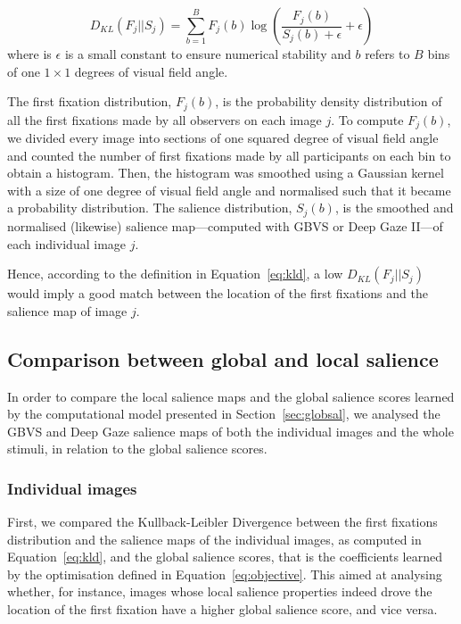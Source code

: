 {\begin{equation}
 D_{KL}(F_{j}||S_{j}) = \sum_{b=1}^{B} F_{j}(b) \log(\frac{F_{j}(b)}{S_{j}(b)+\epsilon}+\epsilon)
 \label{eq:kld}
\end{equation}
%
where is $\epsilon$ is a small constant to ensure numerical stability and $b$ refers to $B$ bins of one $1 \times 1$ degrees of visual field angle.

The first fixation distribution, $F_{j}(b)$, is the probability density distribution of all the first fixations made by all observers on each image $j$. To compute $F_{j}(b)$, we divided every image into sections of one squared degree of visual field angle and counted the number of first fixations made by all participants on each bin to obtain a histogram. Then, the histogram was smoothed using a Gaussian kernel with a size of one degree of visual field angle and normalised such that it became a probability distribution. The salience distribution, $S_{j}(b)$, is the smoothed and normalised (likewise) salience map---computed with GBVS or Deep Gaze II---of each individual image $j$.

Hence, according to the definition in Equation~\ref{eq:kld}, a low $D_{KL}(F_{j}||S_{j})$ would imply a good match between the location of the first fixations and the salience map of image $j$.

\subsection{Comparison between global and local salience}
\label{sec:locsal-glob_vs_loc}

In order to compare the local salience maps and the global salience scores learned by the computational model presented in Section~\ref{sec:globsal}, we analysed the GBVS and Deep Gaze salience maps of both the individual images and the whole stimuli, in relation to the global salience scores.

\subsubsection{Individual images}

First, we compared the Kullback-Leibler Divergence between the first fixations distribution and the salience maps of the individual images, as computed in Equation~\ref{eq:kld}, and the global salience scores, that is the coefficients learned by the optimisation defined in Equation~\ref{eq:objective}. This aimed at analysing whether, for instance, images whose local salience properties indeed drove the location of the first fixation have a higher global salience score, and vice versa.

}
